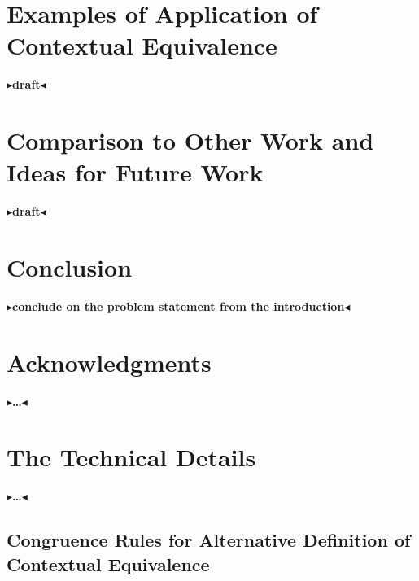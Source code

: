 \documentclass[twoside,11pt,openright]{report}
\theoremstyle{definition}
\newcommand{\todo}[1]{{\color[rgb]{.5,0,0}\textbf{$\blacktriangleright$#1$\blacktriangleleft$}}}
\begin{document}

\chapter{Examples of Application of Contextual Equivalence}
\label{ch:ACE}

\todo{draft}


\chapter{Comparison to Other Work and Ideas for Future Work}
\label{ch:COWFW}

\todo{draft}


\chapter{Conclusion}
\label{ch:conclusion}

\todo{conclude on the problem statement from the introduction}

\chapter*{Acknowledgments}

\todo{\dots}


\cleardoublepage
{}
 



\cleardoublepage
\appendix
\chapter{The Technical Details}

\todo{\dots}

\section{Congruence Rules for Alternative Definition of Contextual Equivalence}\label{appendix:Cgr}
\end{document}

